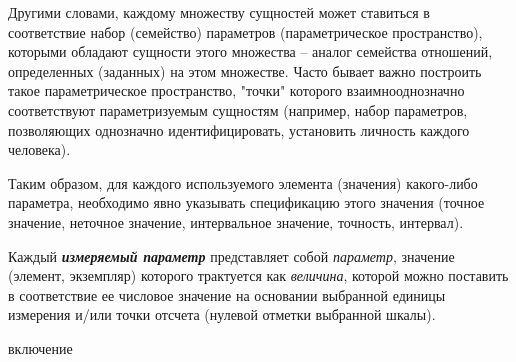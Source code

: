 Другими словами, каждому множеству сущностей может ставиться в соответствие набор (семейство) параметров (параметрическое пространство), которыми обладают сущности этого множества -- аналог семейства отношений, определенных (заданных) на этом множестве. Часто бывает важно построить такое параметрическое пространство, "точки"{} которого взаимнооднозначно соответствуют параметризуемым сущностям (например, набор параметров, позволяющих однозначно идентифицировать, установить личность каждого человека). 
		
Таким образом, для каждого используемого элемента (значения) какого-либо параметра, необходимо явно указывать спецификацию этого значения (точное значение, неточное значение, интервальное значение, точность, интервал).
		
	
\begin{SCn}
	
\end{SCn}

Каждый \textbf{\textit{измеряемый параметр}} представляет собой \textit{параметр}, значение (элемент, экземпляр) которого трактуется как \textit{величина}, которой можно поставить в соответствие ее числовое значение на основании выбранной единицы измерения и/или точки отсчета (нулевой отметки выбранной шкалы).

\begin{SCn}
	
	
	

\begin{scnrelfromlist}{включение}
\end{scnrelfromlist}
\end{SCn}

